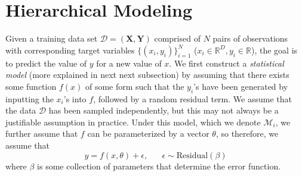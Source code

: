 \section{Hierarchical Modeling}

  Given a training data set $\mathcal{D} = (\mathbf{X}, \mathbf{Y})$ comprised of $N$ pairs of observations with corresponding target variables $\{(x_i, y_i)\}_{i=1}^N$ ($x_i \in \mathbb{R}^D, y_i \in \mathbb{R}$), the goal is to predict the value of $y$ for a new value of $x$. We first construct a \textit{statistical model} (more explained in next next subsection) by assuming that there exists some function $f(x)$ of some form such that the $y_i$'s have been generated by inputting the $x_i$'s into $f$, followed by a random residual term. We assume that the data $\mathcal{D}$ has been sampled independently, but this may not always be a justifiable assumption in practice. Under this model, which we denote $\mathcal{M}_i$, we further assume that $f$ can be parameterized by a vector $\theta$, so therefore, we assume that
  \begin{equation}
    y = f(x, \theta) + \epsilon, \;\;\;\;\;\; \epsilon \sim \text{Residual} (\beta)
  \end{equation}
  where $\beta$ is some collection of parameters that determine the error function.

